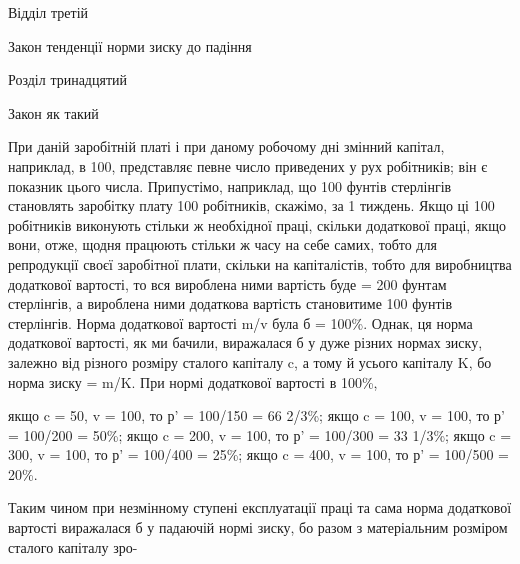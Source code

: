 Відділ третій

Закон тенденції норми зиску до падіння

Розділ тринадцятий

Закон як такий

При даній заробітній платі і при даному робочому дні змінний
капітал, наприклад, в 100, представляє певне число приведених
у рух робітників; він є показник цього числа. Припустімо,
наприклад, що 100 фунтів стерлінгів становлять заробітку плату
100 робітників, скажімо, за 1 тиждень. Якщо ці 100 робітників
виконують стільки ж необхідної праці, скільки додаткової праці,
якщо вони, отже, щодня працюють стільки ж часу на себе
самих, тобто для репродукції своєї заробітної плати, скільки
на капіталістів, тобто для виробництва додаткової вартості, то
вся вироблена ними вартість буде = 200 фунтам стерлінгів,
а вироблена ними додаткова вартість становитиме 100 фунтів
стерлінгів. Норма додаткової вартості m/v була б = 100\%. Однак,
ця норма додаткової вартості, як ми бачили, виражалася б у дуже
різних нормах зиску, залежно від різного розміру сталого капіталу
c, а тому й усього капіталу K, бо норма зиску = m/K. При нормі
додаткової вартості в 100\%,

якщо c = 50, v = 100, то р' = 100/150 = 66 2/3\%;
якщо c = 100, v = 100, то р' = 100/200 = 50\%;
якщо c = 200, v = 100, то р' = 100/300 = 33 1/3\%;
якщо c = 300, v = 100, то р' = 100/400 = 25\%;
якщо c = 400, v = 100, то р' = 100/500 = 20\%.

Таким чином при незмінному ступені експлуатації праці та
сама норма додаткової вартості виражалася б у падаючій нормі
зиску, бо разом з матеріальним розміром сталого капіталу зро-
